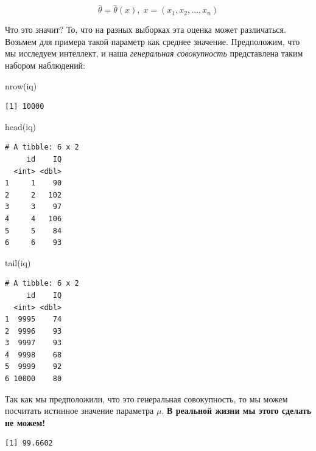 \documentclass[
  letterpaper,
  DIV=11,
  numbers=noendperiod]{scrreprt}
\newenvironment{Shaded}{}{}
\newcommand{\FunctionTok}[1]{\textcolor[rgb]{0.44,0.26,0.76}{#1}}
\newcommand{\NormalTok}[1]{\textcolor[rgb]{0.14,0.16,0.18}{#1}}
\newcommand{\SpecialCharTok}[1]{\textcolor[rgb]{0.00,0.36,0.77}{#1}}
\theoremstyle{definition}
\theoremstyle{remark}
\begin{document}
\[
\hat \theta = \hat \theta (x), \; x = (x_1, x_2, \dots, x_n)
\]

Что это значит? То, что на разных выборках эта оценка может различаться.
Возьмем для примера такой параметр как среднее значение. Предположим,
что мы исследуем интеллект, и наша \emph{генеральная совокупность}
представлена таким набором наблюдений:

\begin{Shaded}
\begin{Highlighting}[]
\FunctionTok{nrow}\NormalTok{(iq)}
\end{Highlighting}
\end{Shaded}

\begin{verbatim}
[1] 10000
\end{verbatim}

\begin{Shaded}
\begin{Highlighting}[]
\FunctionTok{head}\NormalTok{(iq)}
\end{Highlighting}
\end{Shaded}

\begin{verbatim}
# A tibble: 6 x 2
     id    IQ
  <int> <dbl>
1     1    90
2     2   102
3     3    97
4     4   106
5     5    84
6     6    93
\end{verbatim}

\begin{Shaded}
\begin{Highlighting}[]
\FunctionTok{tail}\NormalTok{(iq)}
\end{Highlighting}
\end{Shaded}

\begin{verbatim}
# A tibble: 6 x 2
     id    IQ
  <int> <dbl>
1  9995    74
2  9996    93
3  9997    93
4  9998    68
5  9999    92
6 10000    80
\end{verbatim}

Так как мы предположили, что это генеральная совокупность, то мы можем
посчитать истинное значение параметра \(\mu\). \textbf{В реальной жизни
мы этого сделать не можем!}

\begin{Shaded}
\end{Shaded}

\begin{verbatim}
[1] 99.6602
\end{verbatim}
\end{document}

